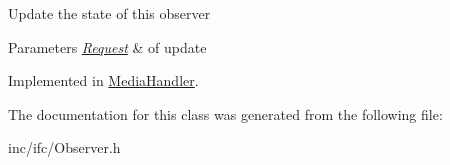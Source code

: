 Update the state of this observer 
\begin{DoxyParams}{Parameters}
{\em \hyperlink{classRequest}{Request}} & of update \\
\hline
\end{DoxyParams}


Implemented in \hyperlink{classMediaHandler_ae0c5fa9c02ac287d2e04699d67a02eaf}{Media\+Handler}.



The documentation for this class was generated from the following file\+:\begin{DoxyCompactItemize}
\item 
inc/ifc/Observer.\+h\end{DoxyCompactItemize}
